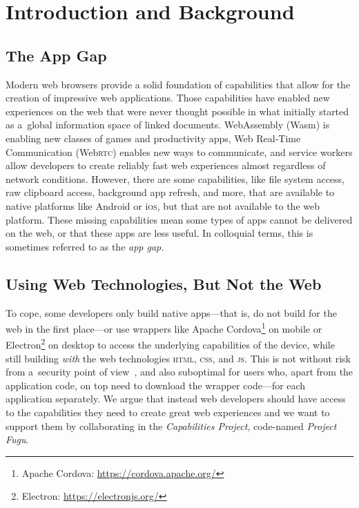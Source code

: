 \documentclass[sigconf]{acmart}
\begin{document}


\maketitle

\section{Introduction and Background}

\subsection{The App Gap}

Modern web browsers provide a solid foundation of capabilities
that allow for the creation of impressive web applications.
Those capabilities have enabled new experiences on the web
that were never thought possible in what initially started as
a~global information space of linked documents.
WebAssembly (Wasm) is enabling new classes of games and productivity apps,
Web Real-Time Communication (Web\textsc{rtc}) enables new ways to communicate,
and service workers allow developers to create reliably fast web experiences
almost regardless of network conditions.
However, there are some capabilities, like file system access,
raw clipboard access, background app refresh, and more,
that are available to native platforms like Android or i\textsc{os},
but that are not available to the web platform.
These missing capabilities mean some types of apps cannot be delivered on the web,
or that these apps are less useful.
In colloquial terms, this is sometimes referred to as the \textit{app gap}.

\subsection{Using Web Technologies, But Not the Web}

To cope, some developers only build native apps---that is,
do not build for the web in the first place---or
use wrappers like Apache Cordova\footnote{Apache Cordova: \url{https://cordova.apache.org/}}
on mobile or Electron\footnote{Electron: \url{https://electronjs.org/}} on desktop
to access the underlying capabilities of the device,
while still building \textit{with} the web technologies
\textsc{html}, \textsc{css}, and \textsc{js}.
This is not without risk from a~security point of view~\cite{carettoni17,luo11},
and also suboptimal for users who, apart from the application code,
on top need to download the wrapper code---for each application separately.
We argue that instead web developers should have access
to the capabilities they need to create great web experiences
and we want to support them by collaborating in the \textit{Capabilities Project},
code-named \textit{Project Fugu}.
\end{document}
